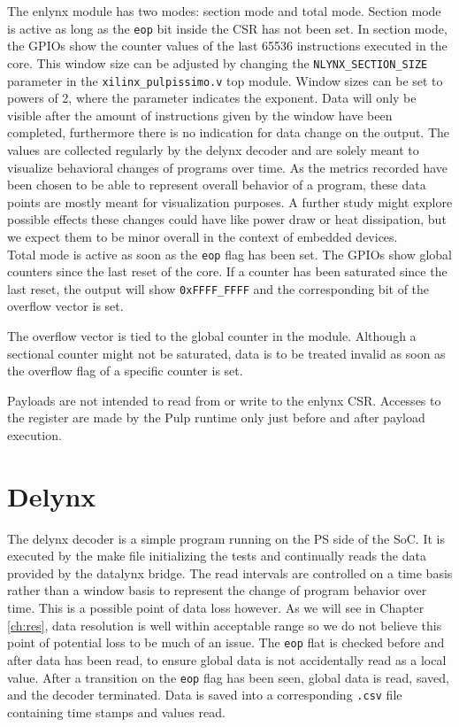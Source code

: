 \documentclass[../bachelor_paper.tex]{subfiles}
\begin{document}
The enlynx module has two modes: section mode and total mode. Section mode is active as long as the \texttt{eop} bit inside the \ac{CSR} has not been set. In section mode, the GPIOs show the counter values of the last 65536
instructions executed in the core. This window size can be adjusted by changing the \texttt{NLYNX\_SECTION\_SIZE} parameter in the \texttt{xilinx\_pulpissimo.v} top module. Window sizes can be set to powers of 2, where the parameter indicates the exponent. Data will only be visible after the amount of instructions given by the window have been completed, furthermore there is no indication for data change on the output. The values are collected regularly by the delynx decoder and are solely meant to visualize behavioral changes of programs over time. As the metrics recorded have been chosen to be able to represent overall behavior of a program, these data points are mostly meant for visualization purposes. A further study might explore possible effects these changes could have like power draw or heat dissipation, but we expect them to be minor overall in the context of embedded devices.\\
Total mode is active as soon as the \texttt{eop} flag has been set. The GPIOs show global counters since the last reset of the core. If a counter has been saturated since the last reset, the output will show \texttt{0xFFFF\_FFFF} and the corresponding bit of the overflow vector is set.

The overflow vector is tied to the global counter in the module. Although a sectional counter might not be saturated, data is to be treated invalid as soon as the overflow flag of a specific counter is set.

Payloads are not intended to read from or write to the enlynx \ac{CSR}. Accesses to the register are made by the Pulp runtime only just before and after payload execution.

\section{Delynx}
The delynx decoder is a simple program running on the \ac{PS} side of the \ac{SoC}. It is executed by the make file initializing the tests and continually reads the data provided by the datalynx bridge. The read intervals are controlled on a time basis rather than a window basis to represent the change of program behavior over time. This is a possible point of data loss however. As we will see in Chapter \ref{ch:res}, data resolution is well within acceptable range so we do not believe this point of potential loss to be much of an issue. The \texttt{eop} flat is checked before and after data has been read, to ensure global data is not accidentally read as a local value. After a transition on the \texttt{eop} flag has been seen, global data is read, saved, and the decoder terminated. Data is saved into a corresponding \texttt{.csv} file containing time stamps and values read.
\end{document}
